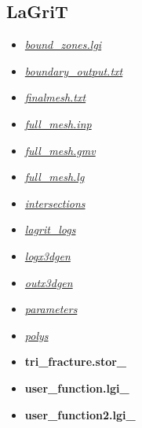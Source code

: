 \documentclass[letterpaper,10pt,english]{sphinxmanual}
\begin{document}
\subsection{LaGriT}
\label{output:lagrit}\begin{itemize}
\item {} 
{\hyperref[output:bound-zones-lgi]{\emph{bound\_zones.lgi}}}

\item {} 
{\hyperref[output:boundary-output-txt]{\emph{boundary\_output.txt}}}

\item {} 
{\hyperref[output:finalmesh-txt]{\emph{finalmesh.txt}}}

\item {} 
{\hyperref[output:full-mesh-inp]{\emph{full\_mesh.inp}}}

\item {} 
{\hyperref[output:full-mesh-gmv]{\emph{full\_mesh.gmv}}}

\item {} 
{\hyperref[output:full-mesh-lg]{\emph{full\_mesh.lg}}}

\item {} 
{\hyperref[output:intersections]{\emph{intersections}}}

\item {} 
{\hyperref[output:lagrit-logs]{\emph{lagrit\_logs}}}

\item {} 
{\hyperref[output:logx3dgen]{\emph{logx3dgen}}}

\item {} 
{\hyperref[output:outx3dgen]{\emph{outx3dgen}}}

\item {} 
{\hyperref[output:parameters]{\emph{parameters}}}

\item {} 
{\hyperref[output:polys]{\emph{polys}}}

\item {} 
{\color{red}\bfseries{}tri\_fracture.stor\_}

\item {} 
{\color{red}\bfseries{}user\_function.lgi\_}

\item {} 
{\color{red}\bfseries{}user\_function2.lgi\_}

\end{itemize}
\end{document}
